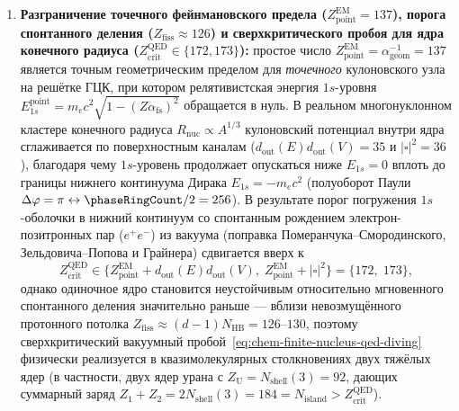 \begin{corollary}[Структура 8-го периода без фундаментального $g$-канала, мишени синтеза при $N=184$ и поправка Померанчука--Смородинского--Грайнера для ядра конечного радиуса]
\begin{enumerate}[leftmargin=*]
  Достижение максимальных времён жизни на вершине острова стабильности требует достройки этих $8\text{--}9$ нейтронов до сферических дважды магических ядер $^{298}_{114}\text{Fl}_{184}$ ($Z = 126 - \geomNeighborTwelve = 114$), $^{304}_{120}\text{Ubn}_{184}$ ($Z = 126 - |\square| = 120$, замыкание $8s^2$-оболочки) и $^{310}_{126}\text{Ubh}_{184}$ ($Z = 2N_{\mathrm{HB}} = 126$).
\item \textbf{Разграничение точечного фейнмановского предела ($Z_{\mathrm{point}}^{\mathrm{EM}} = 137$), порога спонтанного деления ($Z_{\mathrm{fiss}}\approx 126$) и сверхкритического пробоя для ядра конечного радиуса ($Z_{\mathrm{crit}}^{\mathrm{QED}} \in \{172, 173\}$):}
  простое число $Z_{\mathrm{point}}^{\mathrm{EM}} = \alpha_{\mathrm{geom}}^{-1} = 137$ является точным геометрическим пределом для \emph{точечного} кулоновского узла на решётке ГЦК, при котором релятивистская энергия $1s$-уровня $E_{1s}^{\mathrm{point}} = m_e c^2\sqrt{1 - (Z\alpha_{\mathrm{fs}})^2}$ обращается в нуль.
  В реальном многонуклонном кластере конечного радиуса $R_{\mathrm{nuc}}\propto A^{1/3}$ кулоновский потенциал внутри ядра сглаживается по поверхностным каналам ($d_{\mathrm{out}}(E)d_{\mathrm{out}}(V)=35$ и $|\square|^2=36$), благодаря чему $1s$-уровень продолжает опускаться ниже $E_{1s}=0$ вплоть до границы нижнего континуума Дирака $E_{1s} = -m_e c^2$ (полуоборот Паули $\Delta\varphi = \pi \leftrightarrow \phaseRingCount/2 = 256$).
  В результате порог погружения $1s$-оболочки в нижний континуум со спонтанным рождением электрон-позитронных пар ($e^+e^-$) из вакуума (поправка Померанчука--Смородинского, Зельдовича--Попова и Грайнера) сдвигается вверх к
  \begin{equation}
  \label{eq:chem-finite-nucleus-qed-diving}
    Z_{\mathrm{crit}}^{\mathrm{QED}} \in \bigl\{Z_{\mathrm{point}}^{\mathrm{EM}} + d_{\mathrm{out}}(E)d_{\mathrm{out}}(V),\; Z_{\mathrm{point}}^{\mathrm{EM}} + |\square|^2\bigr\} = \bigl\{172,\; 173\bigr\},
  \end{equation}
  однако одиночное ядро становится неустойчивым относительно мгновенного спонтанного деления значительно раньше — вблизи невозмущённого протонного потолка $Z_{\mathrm{fiss}} \approx (d-1)N_{\mathrm{HB}} = 126\text{--}130$, поэтому сверхкритический вакуумный пробой~\eqref{eq:chem-finite-nucleus-qed-diving} физически реализуется в квазимолекулярных столкновениях двух тяжёлых ядер (в частности, двух ядер урана с $Z_{\mathrm{U}} = N_{\mathrm{shell}}(3) = 92$, дающих суммарный заряд $Z_1 + Z_2 = 2N_{\mathrm{shell}}(3) = 184 = N_{\mathrm{island}} > Z_{\mathrm{crit}}^{\mathrm{QED}}$).
\end{enumerate}
\end{corollary}

